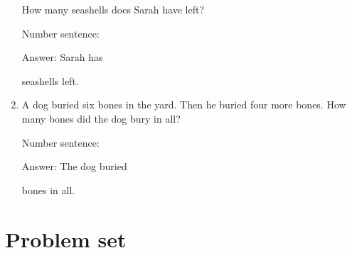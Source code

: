 \documentclass{tufte-book}
\begin{document}
\begin{enumerate}
  How many seashells does Sarah have left?\medskip\par
  Number sentence:
  \dotfill\medskip\par
  Answer: Sarah has
  \dotfill\medskip\par\mbox{}\dotfill\medskip\par\mbox{}\dotfill\bigskip
  seashells left.
\item
  A dog buried six bones in the yard. Then he buried four more bones.
  How many bones did the dog bury in all?\medskip\par
  Number sentence:
  \dotfill\medskip\par
  Answer: The dog buried
  \dotfill\medskip\par\mbox{}\dotfill\medskip\par\mbox{}\dotfill\bigskip
  bones in all.
\end{enumerate}



\clearpage\section{Problem set }
\end{document}

